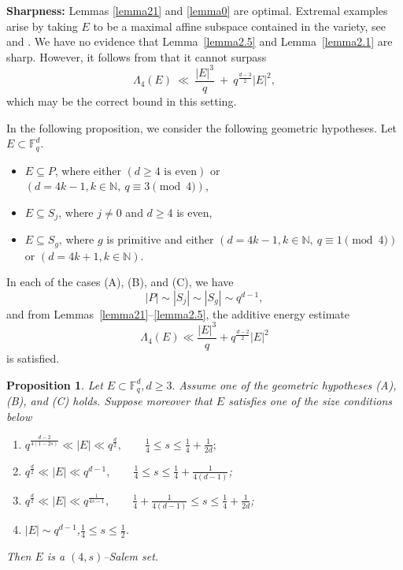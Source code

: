 \documentclass[11pt]{article}
\newtheorem{proposition}[theorem]{Proposition}
\begin{document}
{\bf Sharpness:} Lemmas \ref{lemma21} and \ref{lemma0} are optimal. Extremal examples arise by taking
\(E\) to be a maximal affine subspace contained in the variety, see
\cite[Lemma~1.13]{KPV2021} and \cite[Lemma~2.1]{koh}. We have no evidence that
Lemma~\ref{lemma2.5} and Lemma~\ref{lemma2.1} are sharp. However, it follows from \cite[Lemma~1.13]{KPV2021} that it
cannot surpass
\begin{equation}\label{Energy-3}
\Lambda_4(E)\ \ll\ \frac{|E|^3}{q}\ +\ q^{\frac{d-3}{2}}|E|^2,
\end{equation}
which may be the correct bound in this setting.


In the following proposition, we consider the following geometric hypotheses.
Let $E\subset\mathbb{F}_q^d$. 
\begin{itemize}
  \item[(A)] $E\subseteq P$, where either $(d \geq 4 \mbox{ is even})$ or $(d = 4k-1, k\in \mathbb{N}, ~q \equiv 3 \pmod{4})$, 
  \item[(B)] $E\subseteq S_j$, where $j\ne0$ and $d\ge4$ is even, 
  \item[(C)]$E\subseteq S_g$, where $g$ is primitive and either $(d = 4k - 1, k\in \mathbb{N}, ~q \equiv 1 \pmod{4})$ or $(d = 4k + 1, k\in \mathbb{N})$.
\end{itemize}
In each of the cases (A), (B), and (C), we have 
\begin{equation}\label{SizePS} |P|\sim |S_j|\sim |S_g|\sim q^{d-1},\end{equation} 
and from Lemmas~\ref{lemma21}--\ref{lemma2.5}, the additive energy estimate 
\begin{equation}\label{E4K} \Lambda_4(E) \ll \frac{|E|^3}{q} + q^{\frac{d-2}{2}}|E|^2\end{equation} 
is satisfied.  
\begin{proposition}\label{prop11}
Let $E\subset\mathbb{F}_q^d, d\ge 3.$ Assume one of the geometric hypotheses (A), (B), and (C) holds.
Suppose moreover that $E$ satisfies one of the size conditions below
\begin{enumerate} 
\item[(i)] $ q^{\frac{d-2}{4(1-2s)}} \ll |E| \ll q^{\frac{d}{2}}, \qquad  \frac{1}{4} \leq s \le \frac{1}{4}+\frac{1}{2d}; 
$ \item[(ii)] $ q^{\frac{d}{2}} \ll |E| \ll q^{d-1}, \qquad \frac{1}{4} \leq s \le \frac{1}{4}+\frac{1}{4(d-1)}$; 
\item[(iii)] $q^{\frac{d}{2}} \ll |E| \ll q^{\frac{1}{4s-1}}, \qquad \frac{1}{4}+\frac{1}{4(d-1)} \leq s \le \frac{1}{4}+\frac{1}{2d}$; 
\item[(iv)] $ |E| \sim q^{d-1}$,\qquad $\frac{1}{4}\leq s\leq\frac{1}{2}$.
\end{enumerate}
\noindent Then $E$ is a $(4,s)$--Salem set.
\end{proposition}
\end{document}
